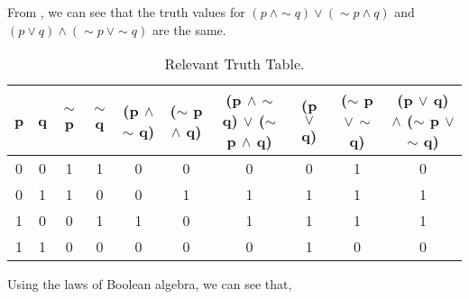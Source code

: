 %
%

\begin{subquestions}


\subquestion

\begin{subsubquestions}
	
\subsubquestion

From , we can see that the truth values for $(p ~\land \sim q) \lor (\sim p \land q)$ and $(p \lor q) \land (\sim p ~\lor \sim q)$ are the same.

\begin{table}[ht]
	\centering
	\begin{tabular}{|c|c|c|c|c|c|c|c|c|c|}
		\hline
		p & q & $\sim$ p & $\sim$ q & (p $\land$ $\sim$ q) & ($\sim$ p $\land$ q) & (p $\land$ $\sim$ q) $\lor$ ($\sim$ p $\land$ q) & (p $\lor$ q) & ($\sim$ p $\lor$ $\sim$ q) & (p $\lor$ q) $\land$ ($\sim$ p $\lor$ $\sim$ q) \\
		\hline
		0 & 0 & 1 & 1 & 0 & 0 & 0 & 0 & 1 & 0  \\
		0 & 1 & 1 & 0 & 0 & 1 & 1 & 1 & 1 & 1  \\ 
		1 & 0 & 0 & 1 & 1 & 0 & 1 & 1 & 1 & 1  \\
		1 & 1 & 0 & 0 & 0 & 0 & 0 & 1 & 0 & 0  \\
		\hline
	\end{tabular}
	\caption{\label{2016:q1:tab:TruthTab1} Relevant Truth Table.}
\end{table}


\subsubquestion

Using the laws of Boolean algebra, we can see that,


\end{subsubquestions}
\end{subquestions}
